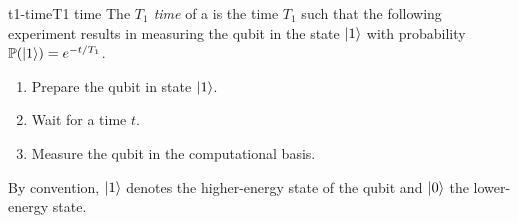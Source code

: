 \begin{topic}{t1-time}{T1 time}
    The \emph{$T_1$ time} of a  is the time $T_1$ such that the following experiment results in measuring the qubit in the state $|1\rangle$ with probability $\mathbb{P}(|1\rangle) = e^{-t / T_1}$.
    \begin{enumerate}[label=(\arabic*)]
        \item Prepare the qubit in state $|1\rangle$.
        \item Wait for a time $t$.
        \item Measure the qubit in the computational basis.
    \end{enumerate}
    By convention, $|1\rangle$ denotes the higher-energy state of the qubit and $|0\rangle$ the lower-energy state.
\end{topic}

